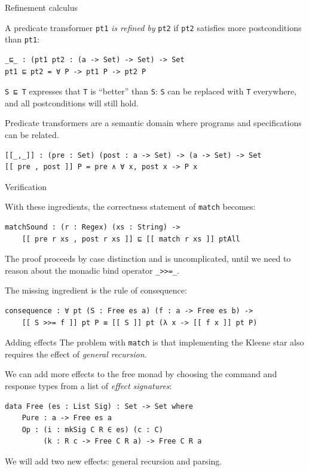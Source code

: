 \documentclass[ignorenonframetext,]{beamer}
\newcommand{\Agda}[1]{\texttt{#1}\xspace}
\newcommand{\match}{\Agda{match}}
\begin{document}
\begin{frame}[fragile]{Refinement calculus}

A predicate transformer \Agda{pt1} \emph{is refined by} \Agda{pt2} if \Agda{pt2} satisfies more postconditions than \Agda{pt1}:

\begin{verbatim}
_⊑_ : (pt1 pt2 : (a -> Set) -> Set) -> Set
pt1 ⊑ pt2 = ∀ P -> pt1 P -> pt2 P
\end{verbatim}

\Agda{S ⊑ T} expresses that \Agda{T} is ``better'' than \Agda{S}:
\Agda{S} can be replaced with \Agda{T} everywhere, and all postconditions will still hold.

\pause

Predicate transformers are a semantic domain where programs and specifications can be related.
\begin{verbatim}
[[_,_]] : (pre : Set) (post : a -> Set) -> (a -> Set) -> Set
[[ pre , post ]] P = pre ∧ ∀ x, post x -> P x
\end{verbatim}

\end{frame}

\begin{frame}[fragile]{Verification}

With these ingredients, the correctness statement of \match becomes:
\begin{verbatim}
matchSound : (r : Regex) (xs : String) ->
    [[ pre r xs , post r xs ]] ⊑ [[ match r xs ]] ptAll
\end{verbatim}

The proof proceeds by case distinction and is uncomplicated, until we need to reason about the monadic bind operator \Agda{\_>>=\_}.

\pause

The missing ingredient is the rule of consequence:
\begin{verbatim}
consequence : ∀ pt (S : Free es a) (f : a -> Free es b) ->
    [[ S >>= f ]] pt P ≡ [[ S ]] pt (λ x -> [[ f x ]] pt P)
\end{verbatim}

\end{frame}

\begin{frame}[fragile]{Adding effects}
The problem with \match is that implementing the Kleene star also requires the effect of \emph{general recursion}.

We can add more effects to the free monad by choosing the command and response types from a list of \emph{effect signatures}:
\begin{verbatim}
data Free (es : List Sig) : Set -> Set where
    Pure : a -> Free es a
    Op : (i : mkSig C R ∈ es) (c : C)
         (k : R c -> Free C R a) -> Free C R a
\end{verbatim}

We will add two new effects: general recursion and parsing.
\end{frame}
\end{document}
